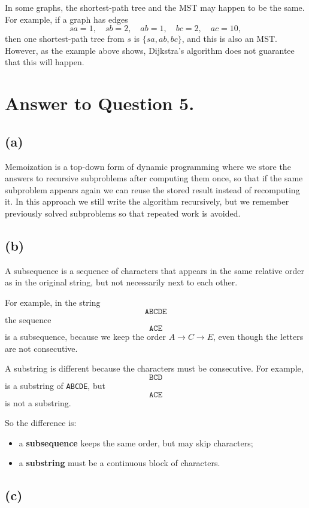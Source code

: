 \documentclass{brockcosc3p03}
\begin{document}
In some graphs, the shortest-path tree and the MST may happen to be the same. For example, if a graph has edges
\[
sa=1,\quad sb=2,\quad ab=1,\quad bc=2,\quad ac=10,
\]
then one shortest-path tree from $s$ is $\{sa,ab,bc\}$, and this is also an MST. However, as the example above shows, Dijkstra's algorithm does not guarantee that this will happen.

\newpage

\section*{Answer to Question 5.}

\subsection*{(a)}

Memoization is a top-down form of dynamic programming where we store the answers to recursive subproblems after computing them once, so that if the same subproblem appears again we can reuse the stored result instead of recomputing it. In this approach we still write the algorithm recursively, but we remember previously solved subproblems so that repeated work is avoided.

\subsection*{(b)}

A subsequence is a sequence of characters that appears in the same relative order as in the original string, but not necessarily next to each other.

For example, in the string
\[
\texttt{ABCDE}
\]
the sequence
\[
\texttt{ACE}
\]
is a subsequence, because we keep the order $A \to C \to E$, even though the letters are not consecutive.

A substring is different because the characters must be consecutive. For example,
\[
\texttt{BCD}
\]
is a substring of \texttt{ABCDE}, but
\[
\texttt{ACE}
\]
is not a substring.

So the difference is:
\begin{itemize}
    \item a \textbf{subsequence} keeps the same order, but may skip characters;
    \item a \textbf{substring} must be a continuous block of characters.
\end{itemize}

\subsection*{(c)}
\end{document}
